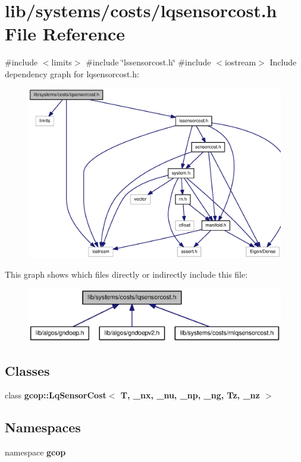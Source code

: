 \section{lib/systems/costs/lqsensorcost.h \-File \-Reference}
\label{lqsensorcost_8h}
{\ttfamily \#include $<$limits$>$}\*
{\ttfamily \#include \char`\"{}lssensorcost.\-h\char`\"{}}\*
{\ttfamily \#include $<$iostream$>$}\*
\-Include dependency graph for lqsensorcost.\-h\-:\nopagebreak
\begin{figure}[H]
\begin{center}
\leavevmode
\includegraphics[width=350pt]{lqsensorcost_8h__incl}
\end{center}
\end{figure}
\-This graph shows which files directly or indirectly include this file\-:\nopagebreak
\begin{figure}[H]
\begin{center}
\leavevmode
\includegraphics[width=350pt]{lqsensorcost_8h__dep__incl}
\end{center}
\end{figure}
\subsection*{\-Classes}
\begin{DoxyCompactItemize}
\item 
class {\bf gcop\-::\-Lq\-Sensor\-Cost$<$ T, \-\_\-nx, \-\_\-nu, \-\_\-np, \-\_\-ng, Tz, \-\_\-nz $>$}
\end{DoxyCompactItemize}
\subsection*{\-Namespaces}
\begin{DoxyCompactItemize}
\item 
namespace {\bf gcop}
\end{DoxyCompactItemize}
